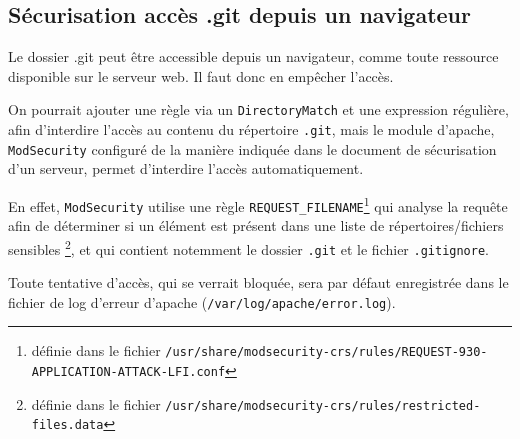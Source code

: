 \subsection{Sécurisation accès .git depuis un navigateur}
Le dossier .git peut être accessible depuis un navigateur, comme toute ressource disponible sur le serveur web. Il faut donc en empêcher l'accès.

On pourrait ajouter une règle via un \texttt{DirectoryMatch} et une expression régulière, afin d'interdire l'accès au contenu du répertoire \texttt{.git}, mais le module d'apache, \texttt{ModSecurity} configuré de la manière indiquée dans le document de sécurisation d'un serveur, permet d'interdire l'accès automatiquement. 

En effet, \texttt{ModSecurity} utilise une règle \texttt{REQUEST\_FILENAME}\footnote{définie dans le fichier \texttt{/usr/share/modsecurity-crs/rules/REQUEST-930-APPLICATION-ATTACK-LFI.conf}} qui analyse la requête afin de déterminer si un élément est présent dans une liste de répertoires/fichiers sensibles \footnote{définie dans le fichier \texttt{/usr/share/modsecurity-crs/rules/restricted-files.data}}, et qui contient notemment le dossier \texttt{.git} et le fichier \texttt{.gitignore}.

Toute tentative d'accès, qui se verrait bloquée, sera par défaut enregistrée dans le fichier de log d'erreur d'apache (\texttt{/var/log/apache/error.log}).
